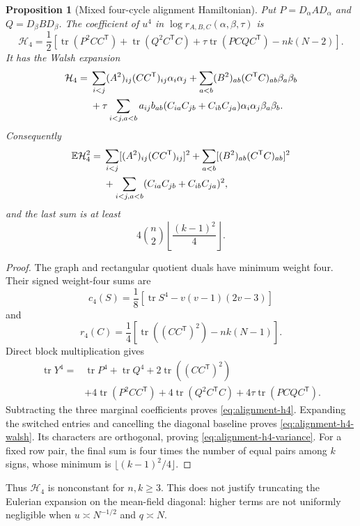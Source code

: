 \documentclass[11pt]{article}
\newtheorem{proposition}[theorem]{Proposition}
\newcommand{\E}{\mathbb E}
\DeclareMathOperator{\tr}{tr}
\begin{document}
\begin{proposition}[Mixed four-cycle alignment Hamiltonian]
\label{prop:alignment-h4}
Put $P=D_\alpha AD_\alpha$ and $Q=D_\beta BD_\beta$.  The coefficient of
$u^4$ in $\log r_{A,B,C}(\alpha,\beta,\tau)$ is
\begin{equation}
 \mathcal H_4=\frac12\left[
 \tr(P^2CC^{\mathsf T})+\tr(Q^2C^{\mathsf T}C)
 +\tau\tr(PCQC^{\mathsf T})-nk(N-2)\right].
 \label{eq:alignment-h4}
\end{equation}
It has the Walsh expansion
\begin{align}
\mathcal H_4={}&
 \sum_{i<j}(A^2)_{ij}(CC^{\mathsf T})_{ij}\alpha_i\alpha_j
 +\sum_{a<b}(B^2)_{ab}(C^{\mathsf T}C)_{ab}\beta_a\beta_b\notag\\
&+\tau\sum_{i<j,a<b}a_{ij}b_{ab}
 (C_{ia}C_{jb}+C_{ib}C_{ja})
 \alpha_i\alpha_j\beta_a\beta_b.
 \label{eq:alignment-h4-walsh}
\end{align}
Consequently
\begin{align}
\E\mathcal H_4^2={}&
 \sum_{i<j}[(A^2)_{ij}(CC^{\mathsf T})_{ij}]^2
 +\sum_{a<b}[(B^2)_{ab}(C^{\mathsf T}C)_{ab}]^2\notag\\
&+\sum_{i<j,a<b}(C_{ia}C_{jb}+C_{ib}C_{ja})^2,
 \label{eq:alignment-h4-variance}
\end{align}
and the last sum is at least
\[
 4\binom n2\left\lfloor\frac{(k-1)^2}{4}\right\rfloor.
\]
\end{proposition}

\begin{proof}
The graph and rectangular quotient duals have minimum weight four.  Their
signed weight-four sums are
\[
 c_4(S)=\frac18[\tr S^4-v(v-1)(2v-3)]
\]
and
\[
 r_4(C)=\frac14[\tr((CC^{\mathsf T})^2)-nk(N-1)].
\]
Direct block multiplication gives
\begin{align*}
\tr Y^4={}&\tr P^4+\tr Q^4+2\tr((CC^{\mathsf T})^2)\\
&+4\tr(P^2CC^{\mathsf T})+4\tr(Q^2C^{\mathsf T}C)
 +4\tau\tr(PCQC^{\mathsf T}).
\end{align*}
Subtracting the three marginal coefficients proves
\eqref{eq:alignment-h4}.  Expanding the switched entries and cancelling the
diagonal baseline proves \eqref{eq:alignment-h4-walsh}.  Its characters are
orthogonal, proving \eqref{eq:alignment-h4-variance}.  For a fixed row pair,
the final sum is four times the number of equal pairs among $k$ signs, whose
minimum is $\lfloor(k-1)^2/4\rfloor$.
\end{proof}

Thus $\mathcal H_4$ is nonconstant for $n,k\ge3$.  This does not justify
truncating the Eulerian expansion on the mean-field diagonal: higher terms are
not uniformly negligible when $u\asymp N^{-1/2}$ and $q\asymp N$.
\end{document}
